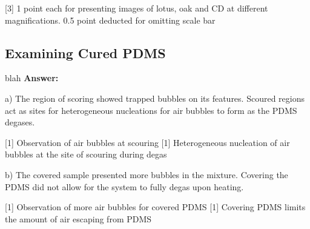 \documentclass[12pt]{article}%
\begin{document}
[3] 1 point each for presenting images of lotus, oak and CD at different magnifications. 0.5 point deducted for omitting scale bar

\subsection {Examining Cured PDMS}
blah
\newline
\textbf{Answer:}
\newline

a) The region of scoring showed trapped bubbles on its features. Scoured regions act as sites for heterogeneous nucleations for air bubbles to form as the PDMS degases.
\newline

[1] Observation of air bubbles at scouring
[1] Heterogeneous nucleation of air bubbles at the site of scouring during degas
\newline

b) The covered sample presented more bubbles in the mixture. Covering the PDMS did not allow for the system to fully degas upon heating.
\newline

[1] Observation of more air bubbles for covered PDMS
[1] Covering PDMS limits the amount of air escaping from PDMS
\end{document}
